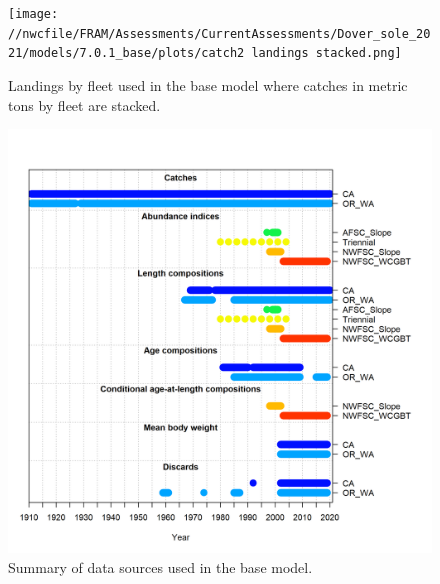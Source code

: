 \documentclass[11pt,
  english,
  a4paper,
]{article}
\begin{document}
\tagmcend\tagstructend


\begin{figure}
\centering
\texttt{[image: //nwcfile/FRAM/Assessments/CurrentAssessments/Dover\_sole\_2021/models/7.0.1\_base/plots/catch2 landings stacked.png]}
\caption{Landings by fleet used in the base model where catches in metric tons by fleet are stacked.\label{fig:catch}}
\end{figure}

\tagmcend\tagstructend


\begin{figure}
\centering
\includegraphics[width=1\textwidth,height=1\textheight]{figs/data_plot.png}
\caption{Summary of data sources used in the base model.\label{fig:data-plot}}
\end{figure}

\tagmcend\tagstructend

\end{document}
